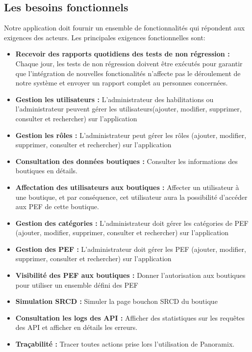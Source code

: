 \subsection[Les besoins fonctionnels]{Les besoins fonctionnels}
Notre application doit fournir un ensemble de fonctionnalités qui répondent aux exigences des acteurs. Les principales exigences fonctionnelles sont:
\begin{itemize}
	\item \textbf{Recevoir des rapports quotidiens des tests de non régression :} Chaque jour, les tests de non régression doivent être exécutés pour garantir que l'intégration de nouvelles fonctionalités n'affecte pas le déroulement de notre système et envoyer un rapport complet au personnes concernées.
	\item \textbf{Gestion les utilisateurs :} L'administrateur des habilitations ou l'administrateur peuvent gérer les utilisateurs(ajouter, modifier, supprimer, consulter et rechercher) sur l'application
	\item \textbf{Gestion les rôles :} L'administrateur peut gérer les rôles (ajouter, modifier, supprimer, consulter et rechercher) sur l'application
	\item \textbf{Consultation des données boutiques :} Consulter les informations des boutiques en détails.
	\item \textbf{Affectation des utilisateurs aux boutiques :} Affecter un utilisateur à une boutique, et par conséquence, cet utilisateur aura la possibilité d'accéder aux PEF de cette boutique. 
	\item \textbf{Gestion des catégories :} L'administrateur doit gérer les catégories de PEF (ajouter, modifier, supprimer, consulter et rechercher) sur l'application
	\item \textbf{Gestion des PEF :} L'administrateur doit gérer les PEF (ajouter, modifier, supprimer, consulter et rechercher) sur l'application
	\item \textbf{Visibilité des PEF aux boutiques :} Donner l'autorisation aux boutiques pour utiliser un ensemble défini des PEF
	\item \textbf{Simulation SRCD :} Simuler la page bouchon SRCD du boutique
	\item \textbf{Consultation les logs des API :} Afficher des statistiques sur les requêtes des API et afficher en détails les erreurs.
	\item \textbf{Traçabilité :} Tracer toutes actions prise lors l'utilisation de Panoramix.
\end{itemize}
